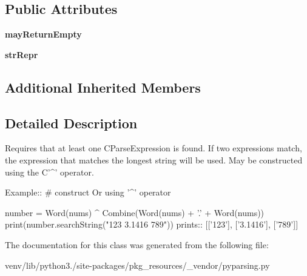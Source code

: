 \subsection*{Public Attributes}
\begin{DoxyCompactItemize}
\item 
\mbox{\label{classpkg__resources_1_1__vendor_1_1pyparsing_1_1_or_a796f8a67719705c07ba78e9b1dcdc5c8}} 
{\bfseries may\+Return\+Empty}
\item 
\mbox{\label{classpkg__resources_1_1__vendor_1_1pyparsing_1_1_or_a922e28b586173a8c73cdcd93fc29cd47}} 
{\bfseries str\+Repr}
\end{DoxyCompactItemize}
\subsection*{Additional Inherited Members}


\subsection{Detailed Description}
\begin{DoxyVerb}Requires that at least one C{ParseExpression} is found.
If two expressions match, the expression that matches the longest string will be used.
May be constructed using the C{'^'} operator.

Example::
    # construct Or using '^' operator
    
    number = Word(nums) ^ Combine(Word(nums) + '.' + Word(nums))
    print(number.searchString("123 3.1416 789"))
prints::
    [['123'], ['3.1416'], ['789']]
\end{DoxyVerb}
 

The documentation for this class was generated from the following file\+:\begin{DoxyCompactItemize}
\item 
venv/lib/python3./site-\/packages/pkg\+\_\+resources/\+\_\+vendor/pyparsing.\+py\end{DoxyCompactItemize}

